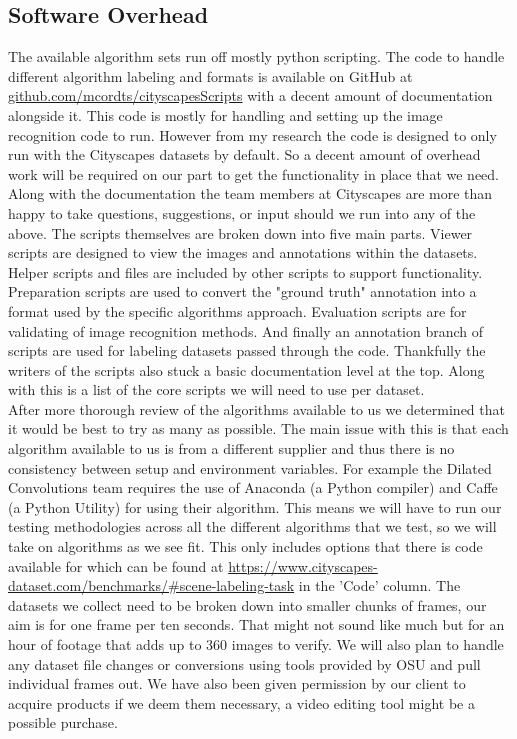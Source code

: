\documentclass[10pt,draftclsnofoot,onecolumn,journal,compsoc]{IEEEtran}
\begin{document}
\subsection{Software Overhead}
The available algorithm sets run off mostly python scripting. 
The code to handle different algorithm labeling and formats is available on GitHub at \url{github.com/mcordts/cityscapesScripts} with a decent amount of documentation alongside it. 
This code is mostly for handling and setting up the image recognition code to run. However from my research the code is designed to only run with the Cityscapes datasets by default. 
So a decent amount of overhead work will be required on our part to get the functionality in place that we need.
Along with the documentation the team members at Cityscapes are more than happy to take questions, suggestions, or input should we run into any of the above.
The scripts themselves are broken down into five main parts. 
Viewer scripts are designed to view the images and annotations within the datasets. 
Helper scripts and files are included by other scripts to support functionality. 
Preparation scripts are used to convert the "ground truth" annotation into a format used by the specific algorithms approach. 
Evaluation scripts are for validating of image recognition methods. 
And finally an annotation branch of scripts are used for labeling datasets passed through the code.
Thankfully the writers of the scripts also stuck a basic documentation level at the top. Along with this is a list of the core scripts we will need to use per dataset.\\
After more thorough review of the algorithms available to us we determined that it would be best to try as many as possible.
The main issue with this is that each algorithm available to us is from a different supplier and thus there is no consistency between setup and environment variables. 
For example the Dilated Convolutions team requires the use of Anaconda (a Python compiler) and Caffe (a Python Utility) for using their algorithm. 
This means we will have to run our testing methodologies across all the different algorithms that we test, so we will take on algorithms as we see fit. 
This only includes options that there is code available for which can be found at \url{https://www.cityscapes-dataset.com/benchmarks/#scene-labeling-task} in the 'Code' column. 
The datasets we collect need to be broken down into smaller chunks of frames, our aim is for one frame per ten seconds.
That might not sound like much but for an hour of footage that adds up to 360 images to verify.
We will also plan to handle any dataset file changes or conversions using tools provided by OSU and pull individual frames out.
We have also been given permission by our client to acquire products if we deem them necessary, a video editing tool might be a possible purchase. 
\end{document}
